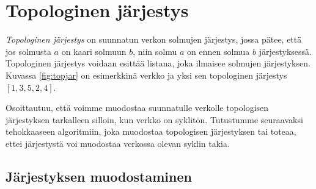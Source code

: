 \section{Topologinen järjestys}


\emph{Topologinen järjestys} on suunnatun verkon solmujen järjestys,
jossa pätee, että jos solmusta $a$ on kaari solmuun $b$,
niin solmu $a$ on ennen solmua $b$ järjestyksessä.
Topologinen järjestys voidaan esittää listana,
joka ilmaisee solmujen järjestyksen.
Kuvassa \ref{fig:topjar} on esimerkkinä verkko ja yksi sen topologinen
järjestys $[1,3,5,2,4]$.

Osoittautuu, että voimme muodostaa suunnatulle verkolle
topologisen järjestyksen tarkalleen silloin,
kun verkko on syklitön.
Tutustumme seuraavaksi tehokkaaseen algoritmiin,
joka muodostaa topologisen järjestyksen
tai toteaa, ettei järjestystä voi muodostaa
verkossa olevan syklin takia.

\subsection{Järjestyksen muodostaminen}

